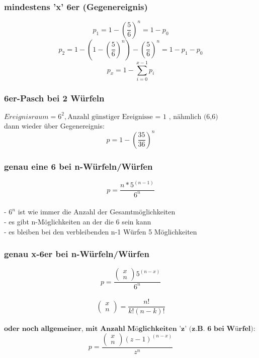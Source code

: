 \documentclass{article}
\begin{document}
	\subsubsection{mindestens 'x' 6er (Gegenereignis)}
	\[	
	p_1 = 1 - \left( \frac{5}{6} \right)^n = 1 - p_0
	\]	
	\[		
	p_2 = 1-\left(1 - \left( \frac{5}{6} \right)^n\right)-\left( \frac{5}{6} \right)^n = 1-p_1 -p_0
	\]
	\[
	p_x = 1 - \sum_{i=0}^{x-1} p_i
	\]
	\subsubsection{6er-Pasch bei 2 Würfeln}
	$Ereignisraum = 6^2 , \text{Anzahl günstiger Ereignisse = 1 , nähmlich (6,6)}$\\
	dann wieder über Gegenereignis: \\
	\[ p=1-\left(\frac{35}{36}\right)^n \]
	\subsubsection{genau eine 6 bei n-Würfeln/Würfen}
	\[ p= \frac{n*5^{(n-1)}}{6^n}\]\\
	- $6^n $ ist wie immer die Anzahl der Gesamtmöglichkeiten \\
	- es gibt n-Möglichkeiten an der die 6 sein kann \\
	- es bleiben bei den verbleibenden n-1 Würfen 5 Möglichkeiten
	\subsubsection{genau x-6er bei n-Würfeln/Würfen}
	\[ p= \frac{\begin{pmatrix}
		x\\n
		\end{pmatrix}5^{(n-x)}}{6^n}\]\\
	\[\begin{pmatrix}
	x\\n
	\end{pmatrix}= \frac{n!}{k!(n-k)!}
	\]\\
	$\textbf{oder noch allgemeiner, mit Anzahl Möglichkeiten 'z' (z.B. 6 bei Würfel):}$\[
	p= \frac{\begin{pmatrix}
		x\\n
		\end{pmatrix}(z-1)^{(n-x)}}{z^n}
	\]
\end{document}
